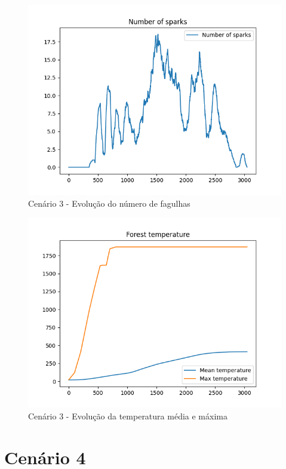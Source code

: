 \begin{figure}[H]
    \centering
    \includegraphics[width=\textwidth]{src/runs/scenario3/sparks.png}
    \caption{Cenário 3 - Evolução do número de fagulhas}
    \label{fig:S3Sparks}
\end{figure}

\begin{figure}[H]
    \centering
    \includegraphics[width=\textwidth]{src/runs/scenario3/temperature.png}
    \caption{Cenário 3 - Evolução da temperatura média e máxima}
    \label{fig:S3Temp}
\end{figure}

\section{Cenário 4}\label{sec:scenario4}

